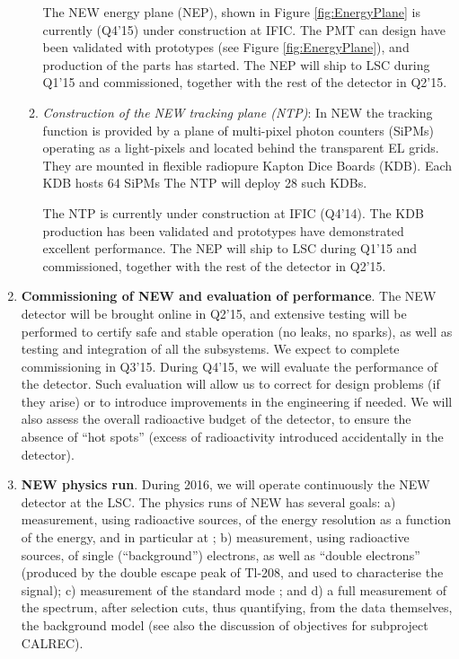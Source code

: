 \begin{enumerate}
\begin{enumerate}
The NEW energy plane (NEP), shown in Figure \ref{fig:EnergyPlane}
is currently (Q4'15) under construction at IFIC. The PMT can design have been validated with prototypes (see Figure  \ref{fig:EnergyPlane}), and production of the parts has started. The NEP will ship to LSC during Q1'15 and commissioned, together with the rest of the detector in Q2'15. 

\item  {\em  Construction of the NEW tracking plane (NTP)}:
In NEW the tracking function is provided by a plane of multi-pixel photon counters (SiPMs) operating as a light-pixels and located behind the transparent EL grids. They are mounted in flexible radiopure Kapton Dice Boards (KDB). Each KDB hosts 64 SiPMs The NTP will deploy 28 such KDBs. 

The NTP is currently under construction at IFIC (Q4'14). The KDB production has been validated and prototypes have demonstrated excellent performance. The NEP will ship to LSC during Q1'15 and commissioned, together with the rest of the detector in Q2'15.  

\end{enumerate}
 
\item {\bf Commissioning of NEW and evaluation of performance}. The NEW detector will be brought online in Q2'15, and extensive testing will be performed to certify safe and stable operation (no leaks, no sparks), as well as testing and integration of all the subsystems. We expect to complete commissioning in Q3'15.
During Q4'15, we will evaluate the performance of the detector. Such evaluation will allow us to correct for design problems (if they arise) or to introduce improvements in the engineering if needed. We will also assess the overall radioactive budget of the detector, to ensure the absence of ``hot spots'' (excess of radioactivity introduced accidentally in the detector). 

\item {\bf NEW physics run}. During 2016, we will operate continuously the NEW detector at the LSC. The physics runs of NEW has several goals: a) measurement, using radioactive sources, of the energy resolution as a function of the energy, and in particular at \Qbb ; b) measurement, using radioactive sources, of single (``background'') electrons, as well as ``double electrons'' (produced by the double escape peak of Tl-208, and used to characterise the signal); c) measurement of the standard mode \bbtnu; and d) a full measurement of the spectrum, after selection cuts, thus quantifying, from the data themselves, the background model (see also the discussion of objectives for subproject CALREC). 
%


\end{enumerate}
